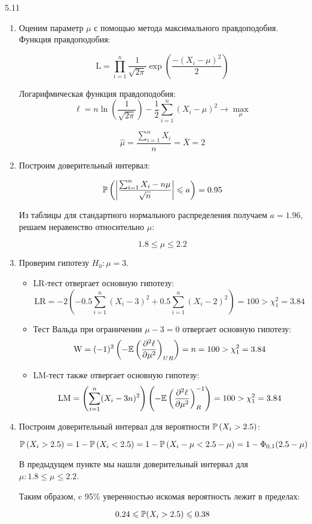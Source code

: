 \protect \hypertarget {soln:5.11}{}
\begin{solution}{{5.11}}
\begin{enumerate}
\item Оценим параметр $\mu$ с помощью метода максимального правдоподобия. Функция правдоподобия:

\[
\text{L} = \prod_{i=1}^{n} \frac{1}{\sqrt{2\pi}}\exp\left( \frac{-\left( X_i -\mu\right) ^2}{2}\right)
\]

Логарифмическая функция правдоподобия:
\[\ell = n \ln \left( \frac{1}{\sqrt{2\pi}}\right) - \frac{1}{2}\sum_{i=1}^{n}\left( X_i-\mu\right) ^2 \to \max_\mu\]

\[\hat{\mu} = \frac{\sum_{i=1}^{n}X_i}{n} = \bar{X} = 2\]

\item Построим доверительный интервал:

\[\P\left(\left|\frac{\sum_{i=1}^{n}X_i - n\mu}{\sqrt{n}} \right| \leqslant a \right) = 0.95 \]

Из таблицы для стандартного нормального распределения получаем $a=1.96$, решаем неравенство относительно $\mu$:

\[1.8 \leqslant \mu \leqslant 2.2\]

\item Проверим гипотезу $H_0: \mu = 3$.
\begin{itemize}
  \item LR-тест отвергает основную гипотезу:
    \[\text{LR} = -2\left( -0.5\sum_{i=1}^{n}(X_i-3)^2+0.5\sum_{i=1}^{n}(X_i-2)^2\right)  = 100 > \chi^2_1 = 3.84\]
    \item Тест Вальда  при ограничении $\mu - 3 = 0$ отвергает основную гипотезу:
    \[\text{W} = (-1)^2\left(-\E\left(\frac{\partial^2 \ell}{\partial \mu^2}\right) _{UR}\right)  = n = 100 > \chi^2_1 = 3.84\]
    \item LM-тест также отвергает основную гипотезу:
    \[\text{LM} = \left(\sum_{i=1}^{n}(X_i-3n)^2\right) \left( -\E\left(\frac{\partial^2 \ell}{\partial \mu^2}\right)^{-1}_{R}\right) = 100 > \chi^2_1 = 3.84\]
\end{itemize}

\item Построим доверительный интервал для вероятности $\P\left( X_i>2.5\right)$:

\[\P\left( X_i>2.5\right) = 1 - \P\left( X_i<2.5\right)  = 1 - \P\left(X_i-\mu < 2.5-\mu \right) = 1 - \Phi_{0,1}(2.5-\mu)\]

В предыдущем пункте мы нашли доверительный интервал для $\mu: 1.8 \leqslant \mu \leqslant 2.2$.

Таким образом, c 95\% уверенностью искомая вероятность лежит в пределах:

\[0.24 \leqslant \P(X_i>2.5) \leqslant 0.38\]
\end{enumerate}
\end{solution}
